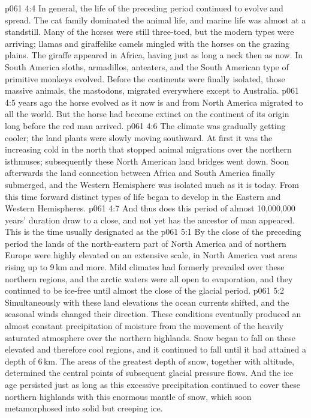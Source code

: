 \vs p061 4:4 In general, the life of the preceding period continued to evolve and spread. The cat family dominated the animal life, and marine life was almost at a standstill. Many of the horses were still three\hyp{}toed, but the modern types were arriving; llamas and giraffelike camels mingled with the horses on the grazing plains. The giraffe appeared in Africa, having just as long a neck then as now. In South America sloths, armadillos, anteaters, and the South American type of primitive monkeys evolved. Before the continents were finally isolated, those massive animals, the mastodons, migrated everywhere except to Australia.
\vs p061 4:5 \pc {} years ago the horse evolved as it now is and from North America migrated to all the world. But the horse had become extinct on the continent of its origin long before the red man arrived.
\vs p061 4:6 The climate was gradually getting cooler; the land plants were slowly moving southward. At first it was the increasing cold in the north that stopped animal migrations over the northern isthmuses; subsequently these North American land bridges went down. Soon afterwards the land connection between Africa and South America finally submerged, and the Western Hemisphere was isolated much as it is today. From this time forward distinct types of life began to develop in the Eastern and Western Hemispheres.
\vs p061 4:7 \pc And thus does this period of almost 10,000,000 years’ duration draw to a close, and not yet has the ancestor of man appeared. This is the time usually designated as the 
\vs p061 5:1 By the close of the preceding period the lands of the north\hyp{}eastern part of North America and of northern Europe were highly elevated on an extensive scale, in North America vast areas rising up to 9\,km and more. Mild climates had formerly prevailed over these northern regions, and the arctic waters were all open to evaporation, and they continued to be ice\hyp{}free until almost the close of the glacial period.
\vs p061 5:2 Simultaneously with these land elevations the ocean currents shifted, and the seasonal winds changed their direction. These conditions eventually produced an almost constant precipitation of moisture from the movement of the heavily saturated atmosphere over the northern highlands. Snow began to fall on these elevated and therefore cool regions, and it continued to fall until it had attained a depth of 6\,km. The areas of the greatest depth of snow, together with altitude, determined the central points of subsequent glacial pressure flows. And the ice age persisted just as long as this excessive precipitation continued to cover these northern highlands with this enormous mantle of snow, which soon metamorphosed into solid but creeping ice.
